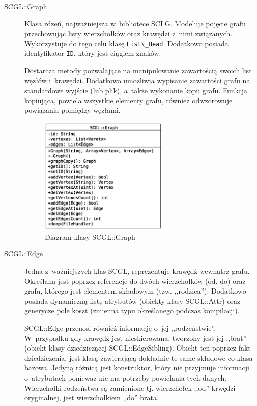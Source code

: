 \documentclass[a4paper,12pt,polish,oneside,openright]{thesis}
\newcommand\code[1]{\lstinline[style=line]{#1}}
\begin{document}
\begin{description}
	\item[SCGL::Graph]
	Klasa rdzeń, najważniejsza w~bibliotece SCLG.
	Modeluje pojęcie grafu przechowując listy wierzchołków oraz krawędzi z~nimi związanych.
	Wykorzystuje do tego celu klasę \code{List\_Head}.
	Dodatkowo posiada identyfikator \code{ID}, który jest ciągiem znaków.

	Dostarcza metody pozwalające na manipulowanie zawartością swoich list węzłów i~krawędzi.
	Dodatkowo umożliwia wypisanie zawartości grafu na standardowe wyjście (lub plik), a~także wykonanie kopii grafu.
	Funkcja kopiująca, powiela wszystkie elementy grafu, również odwzorowuje powiązania pomiędzy węzłami.
	\begin{figure}[htb]
	\begin{center}
		\includegraphics[width=0.60\textwidth]{gfx/class_graph.eps}
		\caption{Diagram klasy SCGL::Graph}
	\end{center}
	\end{figure}

	\item[SCGL::Edge]
	Jedna z~ważniejszych klas SCGL, reprezentuje krawędź wewnątrz grafu.
	Określana jest poprzez referencje do dwóch wierzchołków (od, do) oraz grafu, którego jest elementem składowym (tzw. ,,rodzica'').
	Dodatkowo posiada dynamiczną listę atrybutów (obiekty klasy SCGL::Attr) oraz generycze pole koszt (zmienna typu określanego podczas kompilacji).

	SCGL::Edge przenosi również informację o~jej ,,rodzeństwie''.
	W~przypadku gdy krawędź jest nieskierowana, tworzony jest jej ,,brat'' (obiekt klasy dziedziczącej SCGL::EdgeSibling).
	Obiekt ten poprzez fakt dziedziczenia, jest klasą zawierającą dokładnie te same składowe co klasa bazowa. Jedyną różnicą jest konstruktor, który nie przyjmuje informacji o~atrybutach ponieważ nie ma potrzeby powielania tych danych.
	Wierzchołki rodzeństwa są zamienione tj. wierzchołek ,,od'' krwędzi oryginalnej, jest wierzchołkiem ,,do'' brata.


\end{description}
\end{document}
